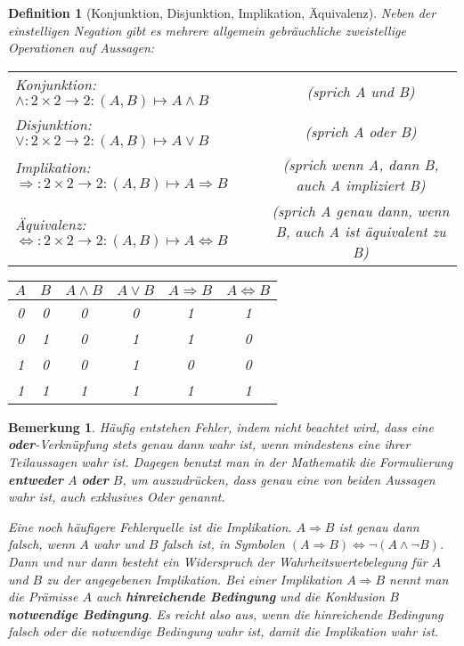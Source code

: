 \documentclass[a4paper]{article}
\newtheorem{bemerkung}[satz]{Bemerkung}
\newtheorem{definition}[satz]{Definition} %
\theoremstyle{nonumberplain}
\begin{document}
\begin{definition}[Konjunktion, Disjunktion, Implikation, Äquivalenz] Neben der einstelligen Negation gibt es mehrere allgemein gebräuchliche zweistellige Operationen auf Aussagen:

\begin{center}
\begin{tabular}{lc}
	Konjunktion: $\land : 2 \times 2 \to 2 : (A,B) \mapsto A \land B$ &
		(sprich \glqq A und B\grqq )\\
	Disjunktion: $\lor : 2 \times 2 \to 2 : (A,B) \mapsto A \lor B$ &
		(sprich \glqq A oder B\grqq )\\
	Implikation: $\Rightarrow : 2 \times 2 \to 2 : (A,B) \mapsto A \Rightarrow B$ &
		(sprich \glqq wenn A, dann B\grqq , auch \glqq A impliziert B\grqq )\\
	Äquivalenz: $\Leftrightarrow : 2 \times 2 \to 2 : (A,B) \mapsto A \Leftrightarrow B$ &
		(sprich \glqq A genau dann, wenn B\grqq, auch \glqq A ist äquivalent zu B\grqq )
\end{tabular}
\end{center}

\begin{center}
\begin{tabular}{|c|c|c|c|c|c|}
	\hline
	$A$ & $B$ & $A\land B$ & $A\lor B$ & $A\Rightarrow B$ & $A\Leftrightarrow B$ \\
	\hline
	0 & 0 & 0 & 0 & 1 & 1 \\
	\hline
	0 & 1 & 0 & 1 & 1 & 0 \\
	\hline
	1 & 0 & 0 & 1 & 0 & 0 \\
	\hline
	1 & 1 & 1 & 1 & 1 & 1 \\
	\hline 
\end{tabular}
\end{center}
\end{definition}
\begin{bemerkung}
Häufig entstehen Fehler, indem nicht beachtet wird, dass eine \textbf{oder}-Verknüpfung stets genau dann wahr ist, wenn \textit{mindestens eine} ihrer Teilaussagen wahr ist. Dagegen benutzt man in der Mathematik die Formulierung \glqq \textbf{entweder} $A$ \textbf{oder} $B$\grqq , um auszudrücken, dass \textit{genau eine} von beiden Aussagen wahr ist, auch \textit{exklusives Oder} genannt.

Eine noch häufigere Fehlerquelle ist die Implikation. $A\Rightarrow B$ ist genau dann falsch, wenn $A$ wahr und $B$ falsch ist, in Symbolen $(A\Rightarrow B) \Leftrightarrow \neg (A \land \neg B)$. Dann und nur dann besteht ein Widerspruch der Wahrheitswertebelegung für $A$ und $B$ zu der angegebenen Implikation. Bei einer Implikation $A \Rightarrow B$ nennt man die Prämisse $A$ auch \textbf{hinreichende Bedingung} und die Konklusion $B$ \textbf{notwendige Bedingung}. Es reicht also aus, wenn die hinreichende Bedingung falsch oder die notwendige Bedingung wahr ist, damit die Implikation wahr ist.
\end{bemerkung}
\end{document}
